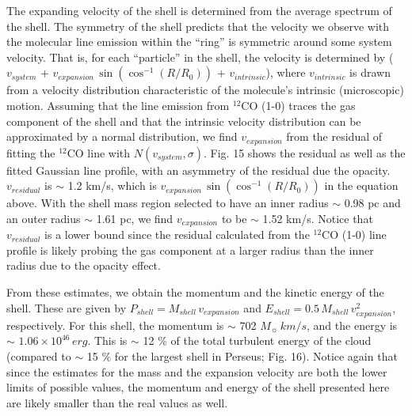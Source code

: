 \documentclass[11pt,a4paper]{emulateapj}
\begin{document}
The expanding velocity of the shell is determined from the average spectrum of the shell. The symmetry of the shell predicts that the velocity we observe with the molecular line emission within the ``ring'' is symmetric around some system velocity. That is, for each ``particle'' in the shell, the velocity is determined by ($v_{system}$ + $v_{expansion}\,\sin{\left(\cos^{-1}{\left(R/R_0\right)}\right)}$ + $v_{intrinsic}$), where $v_{intrinsic}$ is drawn from a velocity distribution characteristic of the molecule's intrinsic (microscopic) motion. Assuming that the line emission from $^{12}$CO (1-0) traces the gas component of the shell and that the intrinsic velocity distribution can be approximated by a normal distribution, we find $v_{expansion}$ from the residual of fitting the $^{12}$CO line with $N(v_{system}, \sigma)$. Fig. 15 shows the residual as well as the fitted Gaussian line profile, with an asymmetry of the residual due the opacity. $v_{residual}$ is $\sim$ 1.2 km/s, which is $v_{expansion}\,\sin{\left(\cos^{-1}{\left(R/R_0\right)}\right)}$ in the equation above. With the shell mass region selected to have an inner radius $\sim$ 0.98 pc and an outer radius $\sim$ 1.61 pc, we find $v_{expansion}$ to be $\sim$ 1.52 km/s. Notice that $v_{residual}$ is a lower bound since the residual calculated from the $^{12}$CO (1-0) line profile is likely probing the gas component at a larger radius than the inner radius due to the opacity effect.

From these estimates, we obtain the momentum and the kinetic energy of the shell. These are given by $P_{shell} = M_{shell}\,v_{expansion}$ and $E_{shell} = 0.5\,M_{shell}\,v^2_{expansion}$, respectively. For this shell, the momentum is $\sim$ 702 $M_{\sun}\,km/s$, and the energy is $\sim$ $1.06\times10^{46}\,erg$. This is $\sim$ 12 \% of the total turbulent energy of the cloud (compared to $\sim$ 15 \% for the largest shell in Perseus; Fig. 16). Notice again that since the estimates for the mass and the expansion velocity are both the lower limits of possible values, the momentum and energy of the shell presented here are likely smaller than the real values as well.
\end{document}
